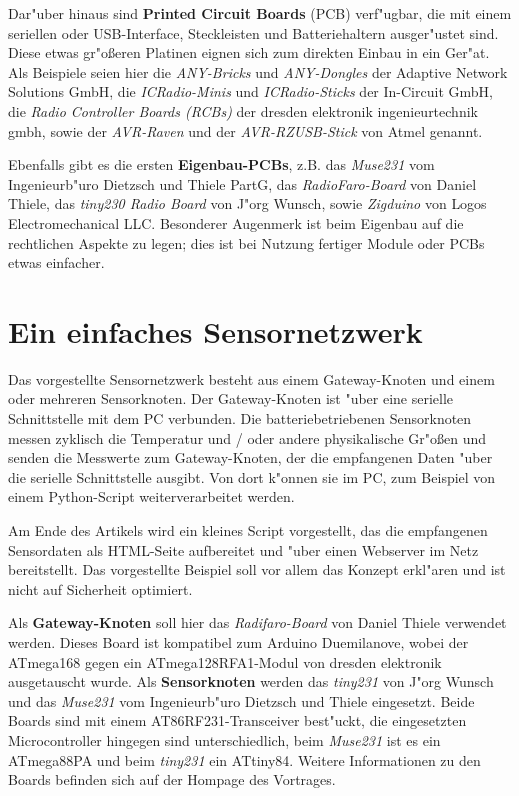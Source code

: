 \documentclass{clt2011}
\begin{document}
Dar"uber hinaus sind {\bf Printed Circuit Boards} (PCB) verf"ugbar, die mit einem seriellen oder USB-Interface,
Steckleisten und Batteriehaltern ausger"ustet sind. Diese etwas gr"o\ss{}eren Platinen eignen sich zum
direkten Einbau in ein Ger"at. Als Beispiele seien hier
die {\em ANY-Bricks} und {\em ANY-Dongles} der \textsf{Adaptive Network Solutions GmbH},
die {\em ICRadio-Minis} und {\em ICRadio-Sticks} der \textsf{In-Circuit GmbH},
die {\em Radio Controller Boards (RCBs)} der \textsf{dresden elektronik ingenieurtechnik gmbh},
sowie der {\em AVR-Raven} und der {\em AVR-RZUSB-Stick} von \textsf{Atmel} genannt.

Ebenfalls gibt es die ersten {\bf Eigenbau-PCBs}, z.B. das {\em Muse231} vom
\textsf{Ingenieurb"uro Dietzsch und Thiele PartG}, das {\em RadioFaro-Board} von Daniel Thiele,
das {\em tiny230 Radio Board} von J"org Wunsch, sowie {\em Zigduino}
von \textsf{Logos Electromechanical LLC}.
Besonderer Augenmerk ist beim Eigenbau auf die rechtlichen Aspekte zu legen; 
dies ist bei Nutzung fertiger Module oder PCBs etwas einfacher.
\section{Ein einfaches Sensornetzwerk}
Das vorgestellte Sensornetzwerk besteht aus einem Gateway-Knoten und
einem oder mehreren Sensorknoten. Der Gateway-Knoten ist "uber eine
serielle Schnittstelle mit dem PC verbunden. Die batteriebetriebenen
Sensorknoten messen zyklisch die Temperatur und / oder andere physikalische
Gr"o\ss{}en  und senden die Messwerte zum Gateway-Knoten, der die empfangenen
Daten "uber die serielle Schnittstelle ausgibt. Von dort k"onnen sie im
PC, zum Beispiel von einem Python-Script weiterverarbeitet werden.

Am Ende des Artikels wird ein kleines Script vorgestellt, das die empfangenen
Sensordaten als HTML-Seite aufbereitet und "uber einen Webserver im Netz bereitstellt.
Das vorgestellte Beispiel soll vor allem das Konzept erkl"aren und ist nicht auf
Sicherheit optimiert.

Als {\bf Gateway-Knoten} soll hier das {\em Radifaro-Board} von Daniel Thiele
verwendet werden. Dieses Board ist kompatibel zum Arduino Duemilanove, wobei der
ATmega168 gegen ein ATmega128RFA1-Modul von \textsf{dresden elektronik} ausgetauscht
wurde. Als {\bf Sensorknoten} werden das {\em tiny231} von J"org Wunsch und das {\em Muse231}
vom \textsf{Ingenieurb"uro Dietzsch und Thiele} eingesetzt.
Beide Boards sind mit einem AT86RF231-Transceiver best"uckt,
die eingesetzten Microcontroller hingegen sind unterschiedlich, beim {\em Muse231} ist es ein ATmega88PA und beim
{\em tiny231} ein ATtiny84. Weitere Informationen zu den Boards befinden sich auf der Hompage des Vortrages.
\end{document}
